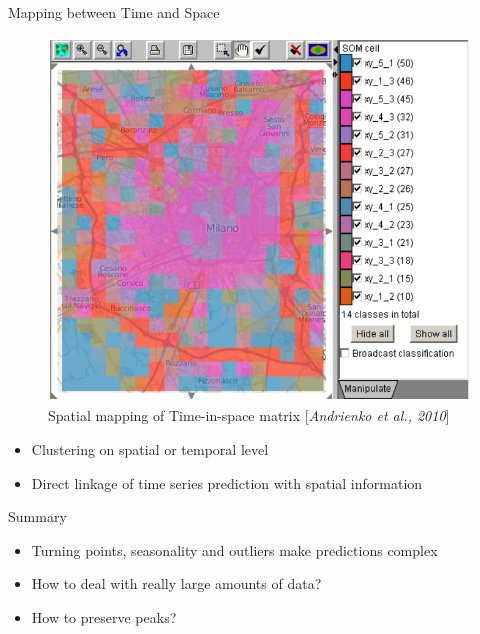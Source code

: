 \documentclass[10pt]{beamer}
\begin{document}
\begin{frame}{Mapping between Time and Space}
\begin{minipage}[t]{0.475\textwidth}
\begin{figure}[htbp]
			\includegraphics[width=\textwidth]{images/SOM_map}
			\caption{Spatial mapping of Time-in-space matrix [\textit{Andrienko et al., 2010}]}
		\end{figure}
	\end{minipage}
	\begin{itemize}
		\item Clustering on spatial or temporal level
		\item Direct linkage of time series prediction with spatial information
	\end{itemize}
\end{frame}


\begin{frame}{Summary}
	\begin{itemize}
		\item Turning points, seasonality and outliers make predictions complex
		\item How to deal with really large amounts of data?
		\item How to preserve peaks?

	\end{itemize}
\end{frame}
\end{document}
